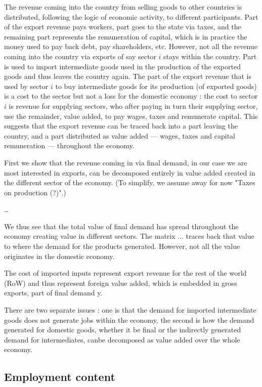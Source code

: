 \documentclass[12pt,english]{article}
\begin{document}
The revenue coming into the country from selling goods to other countries is distributed, following the logic of economic activity, to different participants. Part of the export revenue pays workers, part goes to the state via taxes, and the remaining part represents the remuneration of capital, which is in practice the money used to pay back debt, pay shareholders, etc. However, not all the revenue coming into the country via exports of say sector $i$ stays within the country. Part is used to import intermediate goods used in the production of the exported goods and thus leaves the country again. The part of the export revenue that is used by sector $i$ to buy intermediate goods for its production (of exported goods) is a cost to the sector but not a loss for the domestic economy : the cost to sector $i$ is revenue for supplying sectors, who after paying in turn their supplying sector, use the remainder, value added, to pay wages, taxes and remunerate capital. This suggests that the export revenue can be traced back into a part leaving the country, and a part distributed as value added --- wages, taxes and capital remuneration --- throughout the economy. 

First we show that the revenue coming in via final demand, in our case we are most interested in exports, can be decomposed entirely in value added created in the different sector of the economy. (To simplify, we assume away for now "Taxes on production (?)".)

\ldots

We thus see that the total value of final demand has spread throughout the economy creating value in different sectors. The matrix ... traces back that value to where the demand for the products generated. However, not all the value originates in the domestic economy. 

The cost of imported inputs represent export revenue for the rest of the world (RoW) and thus represent foreign value added, which is embedded in gross exports, part of final demand y. 

There are two separate issues : one is that the demand for imported intermediate goods does not generate jobs within the economy, the second is how the demand generated for domestic goods, whether it be final or the indirectly generated demand for intermediates, canbe decomposed as value added over the whole economy. 


\subsection{Employment content}
\end{document}
